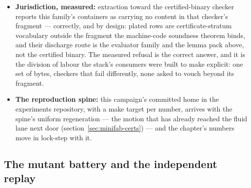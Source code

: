 \begin{itemize}
  $S \models \varphi$ rows for the safety and ranking faces, with
  the verification content normative in the evaluators' walks
  (section~\ref{sec:minifab-spec}). The catalogue states what
  remains open, loudly: no Lean statement binds either rule node
  yet, so the formal lemma pack is still the named successor. The
  gap is not hidden in the artefact: the certificate carries rows
  and demands, and states its consequence as a consequence.
\item \textbf{Jurisdiction, measured:} extraction toward the
  certified-binary checker reports this family's containers as
  carrying no content in that checker's fragment --- correctly, and
  by design: plated rows are certificate-stratum vocabulary outside
  the fragment the machine-code soundness theorem binds, and their
  discharge route is the evaluator family and the lemma pack above,
  not the certified binary. The measured refusal is the correct
  answer, and it is the division of labour the stack's consumers
  were built to make explicit: one set of bytes, checkers that fail
  differently, none asked to vouch beyond its fragment.
\item \textbf{The reproduction spine:} this campaign's committed
  home in the experiments repository, with a make target per number,
  arrives with the spine's uniform regeneration --- the motion that
  has already reached the fluid lane next door
  (section~\ref{sec:minifab-certs}) --- and the chapter's numbers
  move in lock-step with it.
\end{itemize}

\subsection{The mutant battery and the independent replay}
\label{sec:minifab-exact-mutants}

